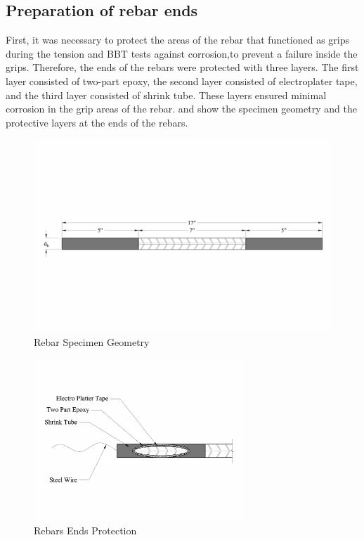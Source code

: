 \subsection{Preparation of rebar ends}

First, it was  necessary to protect the areas of the rebar that functioned as grips   during the tension and BBT tests against corrosion,to prevent a failure inside the grips. Therefore, the ends of the rebars were protected with three layers. The first layer consisted of two-part epoxy, the second layer consisted of electroplater tape, and the third layer consisted of shrink tube. These layers ensured minimal corrosion in the grip areas of the rebar.  and  show the specimen geometry and the protective layers at the ends of the rebars.
\begin{figure}[htbp]
	\centering
	\includegraphics[width=1.0\textwidth]{Chapter-3/figs/RebarSamples}
	\caption{Rebar Specimen Geometry}
	\label{fig:RebarSpecimenGeomtry}
\end{figure}

\begin{figure}[htbp]
	\centering
	\includegraphics[width=0.7\textwidth]{Chapter-3/figs/Rebar_Ends}
	\caption{Rebars Ends Protection}
	\label{fig:RebarEndsProtection}
\end{figure}
\newpage 

